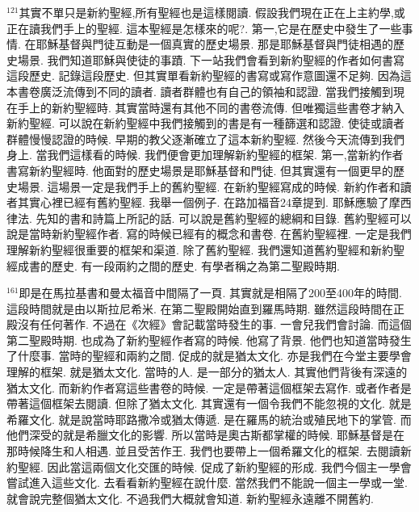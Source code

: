\documentclass{book}
\begin{document}
$^{121}$其實不單只是新約聖經,所有聖經也是這樣閱讀.
假設我們現在正在上主約學,或正在讀我們手上的聖經.
這本聖經是怎樣來的呢?.
第一,它是在歷史中發生了一些事情.
在耶穌基督與門徒互動是一個真實的歷史場景.
那是耶穌基督與門徒相遇的歷史場景.
我們知道耶穌與使徒的事蹟.
下一站我們會看到新約聖經的作者如何書寫這段歷史.
記錄這段歷史.
但其實單看新約聖經的書寫或寫作意圖還不足夠.
因為這本書卷廣泛流傳到不同的讀者.
讀者群體也有自己的領袖和認證.
當我們接觸到現在手上的新約聖經時.
其實當時還有其他不同的書卷流傳.
但唯獨這些書卷才納入新約聖經.
可以說在新約聖經中我們接觸到的書是有一種篩選和認證.
使徒或讀者群體慢慢認證的時候.
早期的教父逐漸確立了這本新約聖經.
然後今天流傳到我們身上.
當我們這樣看的時候.
我們便會更加理解新約聖經的框架.
第一,當新約作者書寫新約聖經時.
他面對的歷史場景是耶穌基督和門徒.
但其實還有一個更早的歷史場景.
這場景一定是我們手上的舊約聖經.
在新約聖經寫成的時候.
新約作者和讀者其實心裡已經有舊約聖經.
我舉一個例子.
在路加福音24章提到.
耶穌應驗了摩西律法.
先知的書和詩篇上所記的話.
可以說是舊約聖經的總綱和目錄.
舊約聖經可以說是當時新約聖經作者.
寫的時候已經有的概念和書卷.
在舊約聖經裡.
一定是我們理解新約聖經很重要的框架和渠道.
除了舊約聖經.
我們還知道舊約聖經和新約聖經成書的歷史.
有一段兩約之間的歷史.
有學者稱之為第二聖殿時期.

$^{161}$即是在馬拉基書和曼太福音中間隔了一頁.
其實就是相隔了200至400年的時間.
這段時間就是由以斯拉尼希米.
在第二聖殿開始直到羅馬時期.
雖然這段時間在正殿沒有任何著作.
不過在《次經》會記載當時發生的事.
一會兒我們會討論.
而這個第二聖殿時期.
也成為了新約聖經作者寫的時候.
他寫了背景.
他們也知道當時發生了什麼事.
當時的聖經和兩約之間.
促成的就是猶太文化.
亦是我們在今堂主要學會理解的框架.
就是猶太文化.
當時的人.
是一部分的猶太人.
其實他們背後有深遠的猶太文化.
而新約作者寫這些書卷的時候.
一定是帶著這個框架去寫作.
或者作者是帶著這個框架去閱讀.
但除了猶太文化.
其實還有一個令我們不能忽視的文化.
就是希羅文化.
就是說當時耶路撒冷或猶太傳遞.
是在羅馬的統治或殖民地下的掌管.
而他們深受的就是希臘文化的影響.
所以當時是奧古斯都掌權的時候.
耶穌基督是在那時候降生和人相遇.
並且受苦作王.
我們也要帶上一個希羅文化的框架.
去閱讀新約聖經.
因此當這兩個文化交匯的時候.
促成了新約聖經的形成.
我們今個主一學會嘗試進入這些文化.
去看看新約聖經在說什麼.
當然我們不能說一個主一學或一堂.
就會說完整個猶太文化.
不過我們大概就會知道.
新約聖經永遠離不開舊約.
\end{document}
